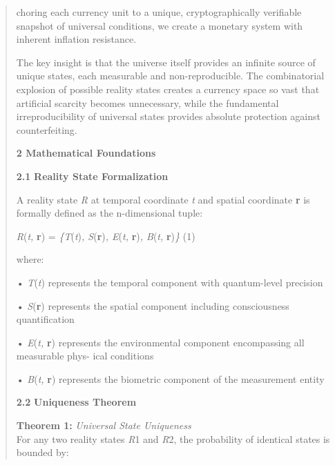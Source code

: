 \documentclass[
]{article}
\begin{document}
\begin{quote}
choring each currency unit to a unique, cryptographically verifiable
snapshot of universal conditions, we create a monetary system with
inherent inflation resistance.

The key insight is that the universe itself provides an infinite source
of unique states, each measurable and non-reproducible. The
combinatorial explosion of possible reality states creates a currency
space so vast that artificial scarcity becomes unnecessary, while the
fundamental irreproducibility of universal states provides absolute
protection against counterfeiting.

\textbf{2 Mathematical Foundations}

\textbf{2.1} \textbf{Reality State Formalization}

A reality state \emph{R} at temporal coordinate \emph{t} and spatial
coordinate \textbf{r} is formally defined as the n-dimensional tuple:

\emph{R}(\emph{t,} \textbf{r}) = \emph{\{T}(\emph{t})\emph{,
S}(\textbf{r})\emph{, E}(\emph{t,} \textbf{r})\emph{, B}(\emph{t,}
\textbf{r})\emph{\}} (1)

where:

• \emph{T}(\emph{t}) represents the temporal component with
quantum-level precision

• \emph{S}(\textbf{r}) represents the spatial component including
consciousness quantification

• \emph{E}(\emph{t,} \textbf{r}) represents the environmental component
encompassing all measurable phys- ical conditions

• \emph{B}(\emph{t,} \textbf{r}) represents the biometric component of
the measurement entity

\textbf{2.2} \textbf{Uniqueness Theorem}

\textbf{Theorem 1:} \emph{Universal State Uniqueness}\\
For any two reality states \emph{R}1 and \emph{R}2, the probability of
identical states is bounded by:
\end{quote}
\end{document}
